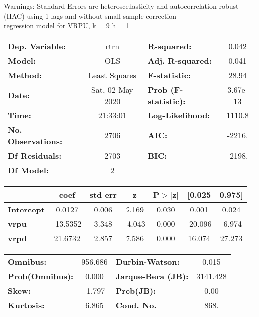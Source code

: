 Warnings: \newline
 [1] Standard Errors are heteroscedasticity and autocorrelation robust (HAC) using 1 lags and without small sample correction\\ 

regression model for VRPU, k = 9 h = 1\begin{center}
\begin{tabular}{lclc}
\toprule
\textbf{Dep. Variable:}    &       rtrn       & \textbf{  R-squared:         } &     0.042   \\
\textbf{Model:}            &       OLS        & \textbf{  Adj. R-squared:    } &     0.041   \\
\textbf{Method:}           &  Least Squares   & \textbf{  F-statistic:       } &     28.94   \\
\textbf{Date:}             & Sat, 02 May 2020 & \textbf{  Prob (F-statistic):} &  3.67e-13   \\
\textbf{Time:}             &     21:33:01     & \textbf{  Log-Likelihood:    } &    1110.8   \\
\textbf{No. Observations:} &        2706      & \textbf{  AIC:               } &    -2216.   \\
\textbf{Df Residuals:}     &        2703      & \textbf{  BIC:               } &    -2198.   \\
\textbf{Df Model:}         &           2      & \textbf{                     } &             \\
\bottomrule
\end{tabular}
\begin{tabular}{lcccccc}
                   & \textbf{coef} & \textbf{std err} & \textbf{z} & \textbf{P$> |$z$|$} & \textbf{[0.025} & \textbf{0.975]}  \\
\midrule
\textbf{Intercept} &       0.0127  &        0.006     &     2.169  &         0.030        &        0.001    &        0.024     \\
\textbf{vrpu}      &     -13.5352  &        3.348     &    -4.043  &         0.000        &      -20.096    &       -6.974     \\
\textbf{vrpd}      &      21.6732  &        2.857     &     7.586  &         0.000        &       16.074    &       27.273     \\
\bottomrule
\end{tabular}
\begin{tabular}{lclc}
\textbf{Omnibus:}       & 956.686 & \textbf{  Durbin-Watson:     } &    0.015  \\
\textbf{Prob(Omnibus):} &   0.000 & \textbf{  Jarque-Bera (JB):  } & 3141.428  \\
\textbf{Skew:}          &  -1.797 & \textbf{  Prob(JB):          } &     0.00  \\
\textbf{Kurtosis:}      &   6.865 & \textbf{  Cond. No.          } &     868.  \\
\bottomrule
\end{tabular}
\end{center}


